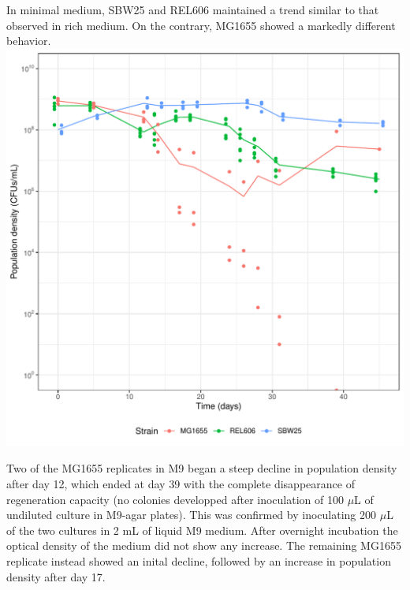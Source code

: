 \documentclass[
	11pt,
	a4paper,
]{article} %
\begin{document}
\begin{multicols}{2}
In minimal medium, SBW25 and REL606 maintained a trend similar to that observed in rich medium.
On the contrary, MG1655 showed a markedly different behavior.
\\[2ex]
\includegraphics[width=\columnwidth]{mean_plot_M9.pdf}
\vspace{2ex}


Two of the MG1655 replicates in M9 began a steep decline in population density after day 12, which ended at day 39 with the complete disappearance of regeneration capacity (no colonies developped after inoculation of 100 $\mu$L of undiluted culture in M9-agar plates).
This was confirmed by inoculating 200 $\mu$L of the two cultures in 2 mL of liquid M9 medium.
After overnight incubation the optical density of the medium did not show any increase.
The remaining MG1655 replicate instead showed an inital decline, followed by an increase in population density after day 17.

\end{multicols}
\end{document}
